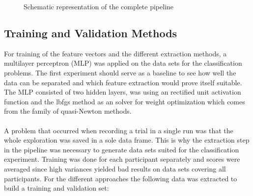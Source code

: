\begin{figure}[h]
	\caption{Schematic representation of the complete pipeline}
	\label{pipeline}
\end{figure}

\subsection{Training and Validation Methods}
For training of the feature vectors and the different extraction methods, a multilayer perceptron (MLP) was applied on the data sets for the classification problems. The first experiment should serve as a baseline to see how well the data can be separated and which feature extraction would prove itself suitable. The MLP consisted of two hidden layers, was using an rectified unit activation function and the lbfgs method as an solver for weight optimization which comes from the family of quasi-Newton methods.\\
\\
A problem that occurred when recording a trial in a single run was that the whole exploration was saved in a sole data frame. This is why the extraction step in the pipeline was necessary to generate data sets suited for the classification experiment. Training was done for each participant separately and scores were averaged since high variances yielded bad results on data sets covering all participants. For the different approaches the following data was extracted to build a training and validation set:

